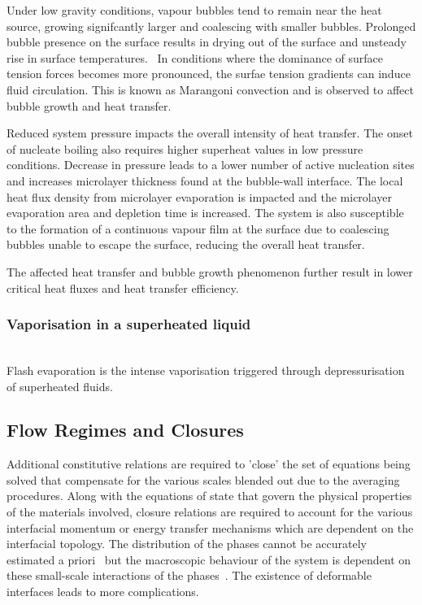 Under low gravity conditions, vapour bubbles tend to remain near the heat source, growing
 signifcantly larger and coalescing with smaller bubbles. Prolonged bubble presence on the
 surface results in drying out of the surface and unsteady rise in surface temperatures.\cite{qiuSingleBubbleDynamicsPool2002}~
 In conditions where the dominance of surface tension forces becomes more pronounced,
 the surfae tension gradients can induce fluid circulation. This is known as Marangoni
 convection and is observed to affect bubble growth and heat transfer.~\cite{xuNumericalStudyMarangoni2014}

Reduced system pressure impacts the overall intensity of heat transfer. The onset of nucleate boiling also
 requires higher superheat values in low pressure conditions.
 Decrease in pressure leads to a lower number of active nucleation sites and increases
 microlayer thickness found at the bubble-wall interface. The local heat flux density from
 microlayer evaporation is impacted and the microlayer evaporation area and depletion time is
 increased. The system is also susceptible to the formation of a continuous vapour film at the 
 surface due to coalescing bubbles unable to escape the surface, reducing the overall heat transfer.~\cite{serdyukovInfluencePressureLocal2023}
 
The affected heat transfer and bubble growth phenomenon further result in lower critical heat fluxes
 and heat transfer efficiency.~\cite{zhangExperimentalTheoreticalStudy2002, PDFMethodAssessing}

\subsubsection{Vaporisation in a superheated liquid}
\hfill\\
Flash evaporation is the intense vaporisation triggered through depressurisation of superheated fluids.

\subsection{Flow Regimes and Closures}
Additional constitutive relations are required to 'close' the set of equations being solved
 that compensate for the various scales blended out due to the averaging procedures.
 Along with the equations of state that govern the physical properties of the materials involved,
 closure relations are required to account for the various interfacial momentum or energy transfer
 mechanisms which are dependent on the interfacial topology.
 The distribution of the phases cannot be accurately estimated
 a priori~\cite{yadigarogluNatureMultiphaseFlows2018} but the macroscopic 
 behaviour of the system is dependent on these small-scale interactions of the 
 phases~\cite{hanrattyPhysicsGasLiquid}. The existence of deformable interfaces 
 leads to more complications.

